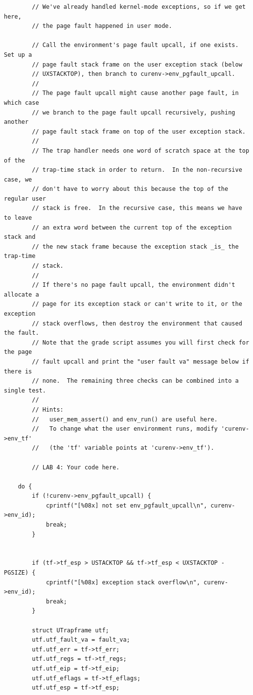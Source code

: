 \begin{ExerciseList}
\begin{verbatim}
        // We've already handled kernel-mode exceptions, so if we get here,
        // the page fault happened in user mode.

        // Call the environment's page fault upcall, if one exists.  Set up a
        // page fault stack frame on the user exception stack (below
        // UXSTACKTOP), then branch to curenv->env_pgfault_upcall.
        //
        // The page fault upcall might cause another page fault, in which case
        // we branch to the page fault upcall recursively, pushing another
        // page fault stack frame on top of the user exception stack.
        //
        // The trap handler needs one word of scratch space at the top of the
        // trap-time stack in order to return.  In the non-recursive case, we
        // don't have to worry about this because the top of the regular user
        // stack is free.  In the recursive case, this means we have to leave
        // an extra word between the current top of the exception stack and
        // the new stack frame because the exception stack _is_ the trap-time
        // stack.
        //
        // If there's no page fault upcall, the environment didn't allocate a
        // page for its exception stack or can't write to it, or the exception
        // stack overflows, then destroy the environment that caused the fault.
        // Note that the grade script assumes you will first check for the page
        // fault upcall and print the "user fault va" message below if there is
        // none.  The remaining three checks can be combined into a single test.
        //
        // Hints:
        //   user_mem_assert() and env_run() are useful here.
        //   To change what the user environment runs, modify 'curenv->env_tf'
        //   (the 'tf' variable points at 'curenv->env_tf').

        // LAB 4: Your code here.

    do {
        if (!curenv->env_pgfault_upcall) {
            cprintf("[%08x] not set env_pgfault_upcall\n", curenv->env_id);
            break;
        }


        if (tf->tf_esp > USTACKTOP && tf->tf_esp < UXSTACKTOP - PGSIZE) {
            cprintf("[%08x] exception stack overflow\n", curenv->env_id);
            break;
        }

        struct UTrapframe utf;
        utf.utf_fault_va = fault_va;
        utf.utf_err = tf->tf_err;
        utf.utf_regs = tf->tf_regs;
        utf.utf_eip = tf->tf_eip;
        utf.utf_eflags = tf->tf_eflags;
        utf.utf_esp = tf->tf_esp;


\end{verbatim}
\end{ExerciseList}
